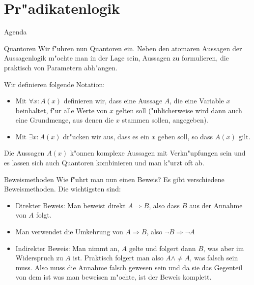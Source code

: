 \documentclass{beamer}
\begin{document}
\section{Pr"adikatenlogik}
\begin{frame}{Agenda}
   
    
  \tableofcontents[currentsection]
  \end{frame}
\begin{frame}{Quantoren}
  Wir f"uhren nun Quantoren ein. Neben den atomaren Aussagen der Aussagenlogik m"ochte man in der Lage sein, Aussagen zu formulieren, die praktisch von Parametern abh"angen.
  \begin{definition}[Quantoren]
    Wir definieren folgende Notation:
    \begin{itemize}
      \item Mit $\forall x:A(x)$ definieren wir, dass eine Aussage $A$, die eine Variable $x$ beinhaltet, f"ur alle Werte von $x$ gelten soll ("ublicherweise wird dann auch eine Grundmenge, aus denen die $x$ stammen sollen, angegeben).
      \item Mit $\exists x:A(x)$ dr"ucken wir aus, dass es ein $x$ geben soll, so dass $A(x)$ gilt.
    \end{itemize}
  \end{definition}

  Die Aussagen $A(x)$ k"onnen komplexe Aussagen mit Verkn"upfungen sein und es lassen sich auch Quantoren kombinieren und man k"urzt oft ab.
\end{frame}

\begin{frame}{Beweismethoden}
  Wie f"uhrt man nun einen Beweis? Es gibt verschiedene Beweismethoden. Die wichtigsten sind:
  \begin{itemize}
    \item Direkter Beweis: Man beweist direkt $A\Rightarrow B$, also dass $B$ aus der Annahme von $A$ folgt.
    \item Man verwendet die Umkehrung von $A\Rightarrow B$, also $\neg B\Rightarrow\neg A$
    \item Indirekter Beweis: Man nimmt an, $A$ gelte und folgert dann $B$, was aber im Widerspruch zu $A$ ist. Praktisch folgert man also $A\wedge\neq A$, was falsch sein muss. Also muss die Annahme falsch gewesen sein und da sie das Gegenteil von dem ist was man beweisen m"ochte, ist der Beweis komplett.
  \end{itemize}
  
\end{frame}
\end{document}
